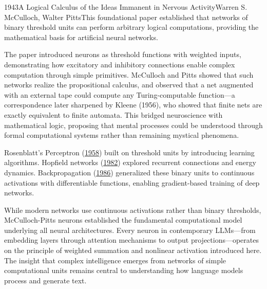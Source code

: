 
\begin{papersummary}{1943}{A Logical Calculus of the Ideas Immanent in Nervous Activity}{Warren S. McCulloch, Walter Pitts}{This foundational paper established that networks of binary threshold units can perform arbitrary logical computations, providing the mathematical basis for artificial neural networks.}

The paper introduced neurons as threshold functions with weighted inputs, demonstrating how excitatory and inhibitory connections enable complex computation through simple primitives. McCulloch and Pitts showed that such networks realize the propositional calculus, and observed that a net augmented with an external tape could compute any Turing-computable function---a correspondence later sharpened by Kleene (1956), who showed that finite nets are exactly equivalent to finite automata. This bridged neuroscience with mathematical logic, proposing that mental processes could be understood through formal computational systems rather than remaining mystical phenomena.

Rosenblatt's Perceptron (\hyperref[paper:rosenblatt-1958]{1958}) built on threshold units by introducing learning algorithms. Hopfield networks (\hyperref[paper:hopfield-1982]{1982}) explored recurrent connections and energy dynamics. Backpropagation (\hyperref[paper:rumelhart-hinton-williams-1986]{1986}) generalized these binary units to continuous activations with differentiable functions, enabling gradient-based training of deep networks.

While modern networks use continuous activations rather than binary thresholds, McCulloch-Pitts neurons established the fundamental computational model underlying all neural architectures. Every neuron in contemporary LLMs—from embedding layers through attention mechanisms to output projections—operates on the principle of weighted summation and nonlinear activation introduced here. The insight that complex intelligence emerges from networks of simple computational units remains central to understanding how language models process and generate text.

\end{papersummary}
